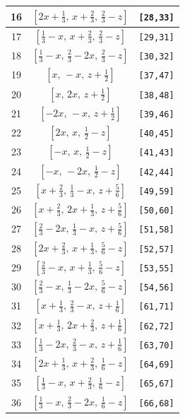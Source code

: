 \documentclass[fleqn,8pt]{jsarticle}
\begin{document}
\begin{longtable}{ccc}
16 & $\left[ 2 x + \frac{1}{3},\, x + \frac{2}{3},\, \frac{2}{3} - z \right]$ & {\tt [28,33]} \\ \hline
17 & $\left[ \frac{1}{3} - x,\, x + \frac{2}{3},\, \frac{2}{3} - z \right]$ & {\tt [29,31]} \\ \hline
18 & $\left[ \frac{1}{3} - x,\, \frac{2}{3} - 2 x,\, \frac{2}{3} - z \right]$ & {\tt [30,32]} \\ \hline
19 & $\left[ x,\, - x,\, z + \frac{1}{2} \right]$ & {\tt [37,47]} \\ \hline
20 & $\left[ x,\, 2 x,\, z + \frac{1}{2} \right]$ & {\tt [38,48]} \\ \hline
21 & $\left[ - 2 x,\, - x,\, z + \frac{1}{2} \right]$ & {\tt [39,46]} \\ \hline
22 & $\left[ 2 x,\, x,\, \frac{1}{2} - z \right]$ & {\tt [40,45]} \\ \hline
23 & $\left[ - x,\, x,\, \frac{1}{2} - z \right]$ & {\tt [41,43]} \\ \hline
24 & $\left[ - x,\, - 2 x,\, \frac{1}{2} - z \right]$ & {\tt [42,44]} \\ \hline
25 & $\left[ x + \frac{2}{3},\, \frac{1}{3} - x,\, z + \frac{5}{6} \right]$ & {\tt [49,59]} \\ \hline
26 & $\left[ x + \frac{2}{3},\, 2 x + \frac{1}{3},\, z + \frac{5}{6} \right]$ & {\tt [50,60]} \\ \hline
27 & $\left[ \frac{2}{3} - 2 x,\, \frac{1}{3} - x,\, z + \frac{5}{6} \right]$ & {\tt [51,58]} \\ \hline
28 & $\left[ 2 x + \frac{2}{3},\, x + \frac{1}{3},\, \frac{5}{6} - z \right]$ & {\tt [52,57]} \\ \hline
29 & $\left[ \frac{2}{3} - x,\, x + \frac{1}{3},\, \frac{5}{6} - z \right]$ & {\tt [53,55]} \\ \hline
30 & $\left[ \frac{2}{3} - x,\, \frac{1}{3} - 2 x,\, \frac{5}{6} - z \right]$ & {\tt [54,56]} \\ \hline
31 & $\left[ x + \frac{1}{3},\, \frac{2}{3} - x,\, z + \frac{1}{6} \right]$ & {\tt [61,71]} \\ \hline
32 & $\left[ x + \frac{1}{3},\, 2 x + \frac{2}{3},\, z + \frac{1}{6} \right]$ & {\tt [62,72]} \\ \hline
33 & $\left[ \frac{1}{3} - 2 x,\, \frac{2}{3} - x,\, z + \frac{1}{6} \right]$ & {\tt [63,70]} \\ \hline
34 & $\left[ 2 x + \frac{1}{3},\, x + \frac{2}{3},\, \frac{1}{6} - z \right]$ & {\tt [64,69]} \\ \hline
35 & $\left[ \frac{1}{3} - x,\, x + \frac{2}{3},\, \frac{1}{6} - z \right]$ & {\tt [65,67]} \\ \hline
36 & $\left[ \frac{1}{3} - x,\, \frac{2}{3} - 2 x,\, \frac{1}{6} - z \right]$ & {\tt [66,68]} \\
\end{longtable}
\end{document}
